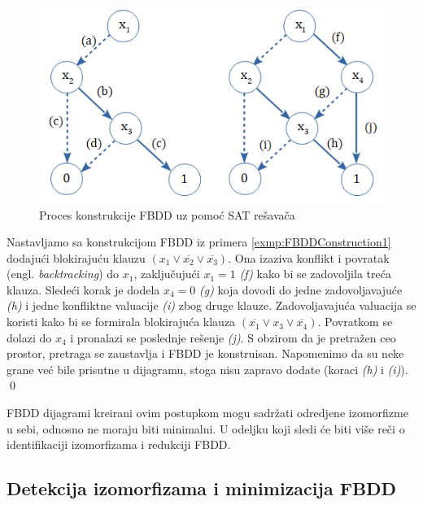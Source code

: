 \begin{figure}[H]
    \centering
    \includegraphics[scale=0.7]{slike/FBDD_Construction.PNG}
    \caption{Proces konstrukcije FBDD uz pomo\'c{} SAT re\v{s}ava\v{c}a}
    \label{diag:FBDDConstruction}
\end{figure}

\begin{exmp}
    Nastavljamo sa konstrukcijom FBDD iz primera \ref{exmp:FBDDConstruction1} dodaju\'c{}i blokiraju\'c{}u klauzu $(x_{1} \vee \overline{x_{2}} \vee \overline{x_{3}})$. Ona izaziva konflikt i povratak (engl. \emph{backtracking}) do $x_{1}$, zaklju\v{c}uju\'c{}i $x_{1} = 1$ \textit{(f)} kako bi se zadovoljila tre\'c{}a klauza. Slede\'c{}i korak je dodela $x_{4} = 0$ \textit{(g)} koja dovodi do jedne zadovoljavaju\'c{}e \textit{(h)} i jedne konfliktne valuacije \textit{(i)} zbog druge klauze. Zadovoljavaju\'c{}a valuacija se koristi kako bi se formirala blokiraju\'c{}a klauza $(\overline{x_{1}} \vee x_{3} \vee \overline{x_{4}})$. Povratkom se dolazi do $x_{4}$ i pronalazi se poslednje re\v{s}enje \textit{(j)}. S obzirom da je pretra\v{z}en ceo prostor, pretraga se zaustavlja i FBDD je konstruisan. Napomenimo da su neke grane ve\'c{} bile prisutne u dijagramu, stoga nisu zapravo dodate (koraci \textit{(h)} i \textit{(i)}).
    \label{exmp:FBDDConstruction2}
    \qed
\end{exmp}

FBDD dijagrami kreirani ovim postupkom mogu sadr\v{z}ati odredjene izomorfizme u sebi, odnosno ne moraju biti minimalni. U odeljku koji sledi \'c{}e biti vi\v{s}e re\v{c}i o identifikaciji izomorfizama i redukciji FBDD.


\subsection{Detekcija izomorfizama i minimizacija FBDD}
\label{subsec:FBDDMinimization}

